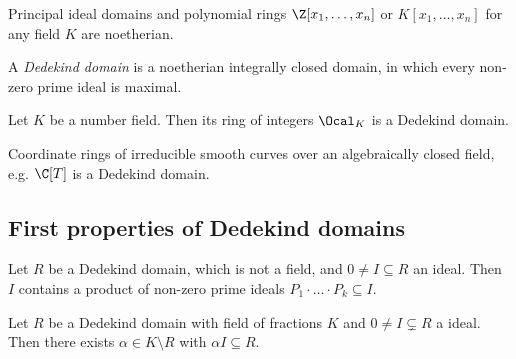 \begin{exmp*}
	Principal ideal domains and polynomial rings \( \Z[x_1, \dotsc, x_n] \) or \( K[x_1, \dotsc, x_n] \) for any field \( K \) are noetherian.
\end{exmp*}

\begin{defn*}
	A \emph{Dedekind domain} is a noetherian integrally closed domain, in which every non-zero prime ideal is maximal.
\end{defn*}

\begin{thmn}
	Let \( K \) be a number field.
	Then its ring of integers \( \Ocal_K \) is a Dedekind domain.
\end{thmn}

\begin{exmp*}
	Coordinate rings of irreducible smooth curves over an algebraically closed field, e.g. \( \C[T] \) is a Dedekind domain.
\end{exmp*}

\subsection*{First properties of Dedekind domains}

\begin{lem}
	Let \( R \) be a Dedekind domain, which is not a field, and \( 0 \neq I \subseteq R \) an ideal.
	Then \( I \) contains a product of non-zero prime ideals \( P_1 \cdot \dots \cdot P_k \subseteq I \).
\end{lem}

\begin{lem}
	Let \( R \) be a Dedekind domain with field of fractions \( K \) and \( 0 \neq I \subsetneq R \) a ideal.
	Then there exists \( \alpha \in K \setminus R \) with \( \alpha I \subseteq R \).
\end{lem}